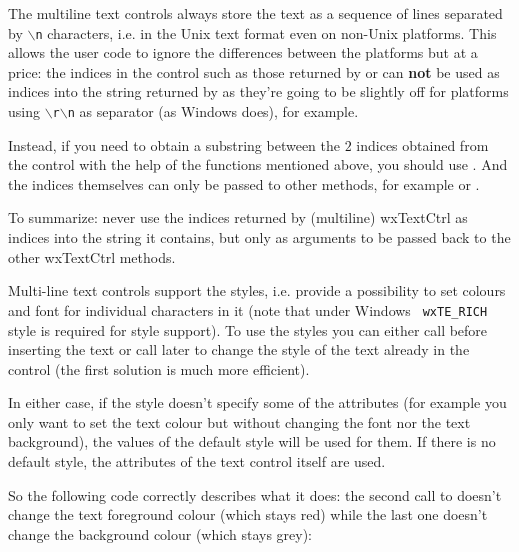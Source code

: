 
The multiline text controls always store the text as a sequence of lines
separated by {\tt $\backslash$n} characters, i.e. in the Unix text format even
on non-Unix platforms. This allows the user code to ignore the differences
between the platforms but at a price: the indices in the control such as those
returned by  or 
 can {\bf not} be used as
indices into the string returned by  as
they're going to be slightly off for platforms using 
{\tt $\backslash$r$\backslash$n} as separator (as Windows does), for example.

Instead, if you need to obtain a substring between the $2$ indices obtained
from the control with the help of the functions mentioned above, you should
use . And the indices themselves can
only be passed to other methods, for example 
 or 
.

To summarize: never use the indices returned by (multiline) wxTextCtrl as
indices into the string it contains, but only as arguments to be passed back
to the other wxTextCtrl methods.


Multi-line text controls support the styles, i.e. provide a possibility to set
colours and font for individual characters in it (note that under Windows {\tt
wxTE\_RICH} style is required for style support). To use the styles you can
either call  before
inserting the text or call  later to
change the style of the text already in the control (the first solution is
much more efficient).

In either case, if the style doesn't specify some of the attributes (for
example you only want to set the text colour but without changing the font nor
the text background), the values of the default style will be used for them.
If there is no default style, the attributes of the text control itself are
used.

So the following code correctly describes what it does: the second call
to  doesn't change the
text foreground colour (which stays red) while the last one doesn't change the
background colour (which stays grey):

